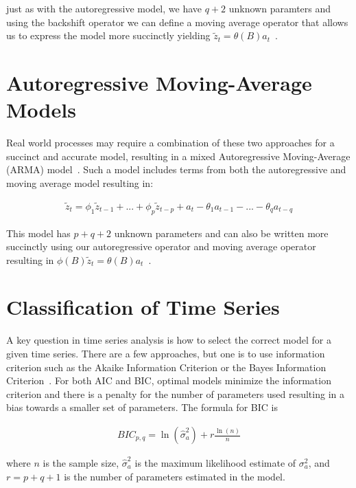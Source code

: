 \documentclass[oneside,12pt,openany]{book}
\begin{document}
	\noindent just as with the autoregressive model, we have $q+2$ unknown paramters and using the backshift operator we can define a moving average operator that allows us to express the model more succinctly yielding $\tilde{z}_{t}=\theta(B)a_{t}$~\cite{Box}.

	\section{Autoregressive Moving-Average Models}
	
	Real world processes may require a combination of these two approaches for a succinct and accurate model, resulting in a mixed Autoregressive Moving-Average (ARMA) model~\cite{Box}. Such a model includes terms from both the autoregressive and moving average model resulting in:
	
	\begin{align}
		\label{eqn:armamodel}
		\tilde{z}_{t}=\phi_{1} \tilde{z}_{t-1}+...+\phi_{p} \tilde{z}_{t-p}+a_{t}-\theta_{1}a_{t-1}-...-\theta_{q}a_{t-q}
	\end{align}
	
	\noindent This model has $p+q+2$ unknown parameters and can also be written more succinctly using our autoregressive operator and moving average operator resulting in $\phi(B)\tilde{z}_{t}=\theta(B)a_{t}$~\cite{Box}.

	\section{Classification of Time Series}\label{sec:timeseries:classification}

	A key question in time series analysis is how to select the correct model for a given time series. There are a few approaches, but one is to use information criterion such as the Akaike Information Criterion or the Bayes Information Criterion~\cite{Box}. For both AIC and BIC, optimal models minimize the information criterion and there is a penalty for the number of parameters used resulting in a bias towards a smaller set of parameters. The formula for BIC is

	\begin{align}
		\label{eqn:bic}
		BIC_{p,q}=\ln(\hat{\sigma}_{a}^{2})+r\frac{\ln(n)}{n}
	\end{align}

	\noindent where $n$ is the sample size, $\hat{\sigma}_{a}^{2}$ is the maximum likelihood estimate of $\sigma_{a}^{2}$, and $r=p+q+1$ is the number of parameters estimated in the model.
	
\end{document}
